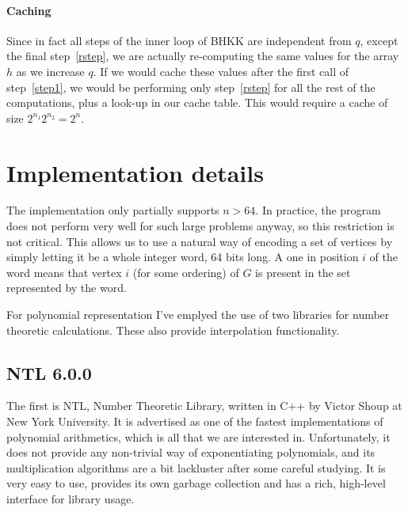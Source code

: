 \documentclass[a4paper]{article}
\begin{document}
\paragraph{Caching} Since in fact all steps of the inner loop of BHKK are independent from $q$, except the final step~\ref{rstep}, we are actually re-computing the same values for the array $h$ as we increase $q$. If we would cache these values after the first call of step~\ref{step1}, we would be performing only step~\ref{rstep} for all the rest of the computations, plus a look-up in our cache table. This would require a cache of size $2^{n_1} 2^{n_2} = 2^n$.


\section{Implementation details}
The implementation only partially supports $n > 64$. In practice, the program does not perform very well for such large problems anyway, so this restriction is not critical. This allows us to use a natural way of encoding a set of vertices by simply letting it be a whole integer word, 64 bits long. A one in position $i$ of the word means that vertex $i$ (for some ordering) of $G$ is present in the set represented by the word.


For polynomial representation I've emplyed the use of two libraries for number theoretic calculations. These also provide interpolation functionality.

\subsection{NTL 6.0.0}
The first is NTL, Number Theoretic Library, written in C++ by Victor Shoup at New York University\cite{ntl}. It is advertised as one of the fastest implementations of polynomial arithmetics, which is all that we are interested in. Unfortunately, it does not provide any non-trivial way of exponentiating polynomials, and its multiplication algorithms are a bit lackluster after some careful studying. It is very easy to use, provides its own garbage collection and has a rich, high-level interface for library usage.
\end{document}
